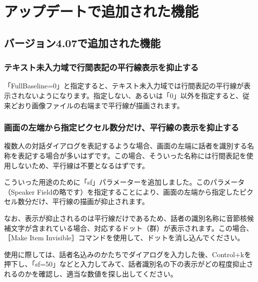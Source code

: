 \chapter{アップデートで追加された機能}

\section{バージョン4.07で追加された機能}

\subsection{テキスト未入力域で行間表記の平行線表示を抑止する}

「FullBaseline=0」と指定すると、テキスト未入力域では行間表記の平行線が表示されないようになります。指定しない、あるいは「0」以外を指定すると、従来どおり画像ファイルの右端まで平行線が描画されます。

\subsection{画面の左端から指定ピクセル数分だけ、平行線の表示を抑止する}

複数人の対話ダイアログを表記するような場合、画面の左端に話者を識別する名称を表記する場合が多いはずです。この場合、そういった名称には行間表記を使用しないため、平行線は不要となるはずです。

こういった用途のために「sf」パラメーターを追加しました。このパラメータ（Speaker Fieldの略です）を指定することにより、画面の左端から指定したピクセル数分だけ、平行線の描画が抑止されます。

なお、表示が抑止されるのは平行線だけであるため、話者の識別名称に音節核候補文字が含まれている場合、対応するドット（群）が表示されます。この場合、［Make Item Invisible］コマンドを使用して、ドットを消し込んでください。

使用に際しては、話者名込みのかたちでダイアログを入力した後、Control+kを押下し、「sf=50」などと入力してみて、話者識別名の下の表示がどの程度抑止されるのかを確認し、適当な数値を探し出してください。
